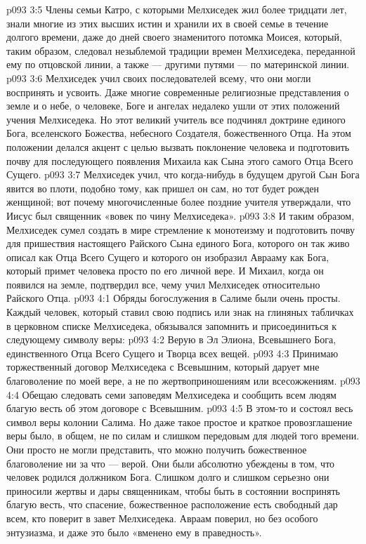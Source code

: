 \vs p093 3:5 Члены семьи Катро, с которыми Мелхиседек жил более тридцати лет, знали многие из этих высших истин и хранили их в своей семье в течение долгого времени, даже до дней своего знаменитого потомка Моисея, который, таким образом, следовал незыблемой традиции времен Мелхиседека, переданной ему по отцовской линии, а также --- другими путями --- по материнской линии.
\vs p093 3:6 Мелхиседек учил своих последователей всему, что они могли воспринять и усвоить. Даже многие современные религиозные представления о земле и о небе, о человеке, Боге и ангелах недалеко ушли от этих положений учения Мелхиседека. Но этот великий учитель все подчинял доктрине единого Бога, вселенского Божества, небесного Создателя, божественного Отца. На этом положении делался акцент с целью вызвать поклонение человека и подготовить почву для последующего появления Михаила как Сына этого самого Отца Всего Сущего.
\vs p093 3:7 Мелхиседек учил, что когда\hyp{}нибудь в будущем другой Сын Бога явится во плоти, подобно тому, как пришел он сам, но тот будет рожден женщиной; вот почему многочисленные более поздние учителя утверждали, что Иисус был священник «вовек по чину Мелхиседека».
\vs p093 3:8 И таким образом, Мелхиседек сумел создать в мире стремление к монотеизму и подготовить почву для пришествия настоящего Райского Сына единого Бога, которого он так живо описал как Отца Всего Сущего и которого он изобразил Аврааму как Бога, который примет человека просто по его личной вере. И Михаил, когда он появился на земле, подтвердил все, чему учил Мелхиседек относительно Райского Отца.
\vs p093 4:1 Обряды богослужения в Салиме были очень просты. Каждый человек, который ставил свою подпись или знак на глиняных табличках в церковном списке Мелхиседека, обязывался запомнить и присоединиться к следующему символу веры:
\vs p093 4:2 \bibnobreakspace Верую в Эл Элиона, Всевышнего Бога, единственного Отца Всего Сущего и Творца всех вещей.
\vs p093 4:3 \bibnobreakspace Принимаю торжественный договор Мелхиседека с Всевышним, который дарует мне благоволение по моей вере, а не по жертвоприношениям или всесожжениям.
\vs p093 4:4 \bibnobreakspace Обещаю следовать семи заповедям Мелхиседека и сообщить всем людям благую весть об этом договоре с Всевышним.
\vs p093 4:5 \pc В этом\hyp{}то и состоял весь символ веры колонии Салима. Но даже такое простое и краткое провозглашение веры было, в общем, не по силам и слишком передовым для людей того времени. Они просто не могли представить, что можно получить божественное благоволение ни за что --- верой. Они были абсолютно убеждены в том, что человек родился должником Бога. Слишком долго и слишком серьезно они приносили жертвы и дары священникам, чтобы быть в состоянии воспринять благую весть, что спасение, божественное расположение есть свободный дар всем, кто поверит в завет Мелхиседека. Авраам поверил, но без особого энтузиазма, и даже это было «вменено ему в праведность».
